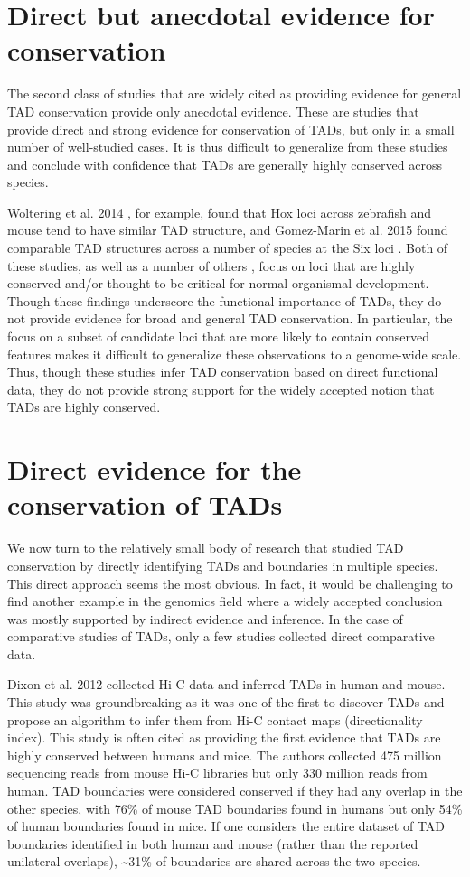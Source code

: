 \section{Direct but anecdotal evidence for conservation}
The second class of studies that are widely cited as providing evidence for general TAD conservation provide only anecdotal evidence. These are studies that provide direct and strong evidence for conservation of TADs, but only in a small number of well-studied cases. It is thus difficult to generalize from these studies and conclude with confidence that TADs are generally highly conserved across species.

Woltering et al. 2014 \cite{Woltering.2014}, for example, found that Hox loci across zebrafish and mouse tend to have similar TAD structure, and Gomez-Marin et al. 2015 found comparable TAD structures across a number of species at the Six loci \cite{Gomez-marin.2015}. Both of these studies, as well as a number of others \cite{Smith.2016, Lupianez.2015, Galupa.2018, Galupa.2020}, focus on loci that are highly conserved and/or thought to be critical for normal organismal development. Though these findings underscore the functional importance of TADs, they do not provide evidence for broad and general TAD conservation. In particular, the focus on a subset of candidate loci that are more likely to contain conserved features makes it difficult to generalize these observations to a genome-wide scale. Thus, though these studies infer TAD conservation based on direct functional data, they do not provide strong support for the widely accepted notion that TADs are highly conserved. 

\section{Direct evidence for the conservation of TADs}
We now turn to the relatively small body of research that studied TAD conservation by directly identifying TADs and boundaries in multiple species. This direct approach seems the most obvious. In fact, it would be challenging to find another example in the genomics field where a widely accepted conclusion was mostly supported by indirect evidence and inference. In the case of comparative studies of TADs, only a few studies collected direct comparative data.

Dixon et al. 2012 \cite{Dixon.2012} collected Hi-C data and inferred TADs in human and mouse. This study was groundbreaking as it was one of the first to discover TADs and propose an algorithm to infer them from Hi-C contact maps (directionality index). This study is often cited as providing the first evidence that TADs are highly conserved between humans and mice. The authors collected 475 million sequencing reads from mouse Hi-C libraries but only 330 million reads from human. TAD boundaries were considered conserved if they had any overlap in the other species, with 76\% of mouse TAD boundaries found in humans but only 54\% of human boundaries found in mice. If one considers the entire dataset of TAD boundaries identified in both human and mouse (rather than the reported unilateral overlaps), \textasciitilde{}31\% of boundaries are shared across the two species.

